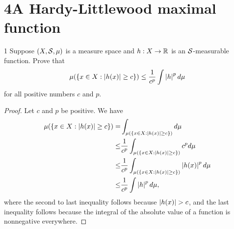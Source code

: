 \section{4A Hardy-Littlewood maximal function}


\begin{exercise}{1}
Suppose $(X, \mathcal{S}, \mu)$ is a measure space and $h: X \to \mathbb{R}$ is an $\mathcal{S}$-measurable function.
Prove that 
\begin{align*}
    \mu(\{x \in X: \left\lvert h(x)\right\rvert \geq c\}) 
    \leq \frac{1}{c^p} \int \left\lvert h\right\rvert^p d\mu
\end{align*}
for all positive numbers $c$ and $p$.
\end{exercise}
\begin{proof}
Let $c$ and $p$ be positive.
We have
\begin{align*}
    \mu(\{x \in X: \left\lvert h(x)\right\rvert \geq c\}) 
    =& \int_{\mu(\{x \in X: \left\lvert h(x)\right\rvert \geq c\})} d\mu\\
    \leq& \frac{1}{c^p} \int_{\mu(\{x \in X: \left\lvert h(x)\right\rvert \geq c\})} c^p d\mu\\
    \leq& \frac{1}{c^p} \int_{\mu(\{x \in X: \left\lvert h(x)\right\rvert \geq c\})} \left\lvert h(x)\right\rvert^p d\mu\\
    \leq& \frac{1}{c^p} \int \left\lvert h\right\rvert^p d\mu,
\end{align*}
where the second to last inequality follows because $\left\lvert h(x)\right\rvert > c$, and the last inequality follows because the integral of the absolute value of a function is nonnegative everywhere.
\end{proof} 

